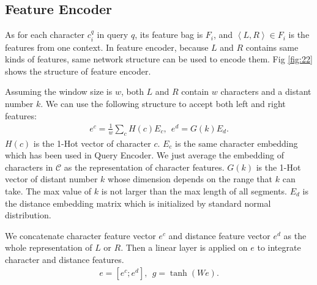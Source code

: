 \subsection{Feature Encoder}

As for each character $c_i^q$ in query $q$, its feature bag is $F_i$, and $\left \langle L, R \right \rangle \in F_i$ is the features from one context. In feature encoder, because $L$ and $R$ contains same kinds of features, same network structure can be used to encode them. Fig \ref{fig:22} shows the structure of feature encoder.


Assuming the window size is $w$, both $L$ and $R$ contain $w$ characters and a distant number $k$. We can use the following structure to accept both left and right features:
\begin{align*}
	e^c = \frac{1} {w} \sum_{c} {H(c)E_c}, \ \ e^d = G(k)E_d.
\end{align*}
$H(c)$ is the 1-Hot vector of character $c$. $E_c$ is the same character embedding which has been used in Query Encoder. We just average the embedding of characters in $\mathcal{C}$ as the representation of character features. $G(k)$ is the 1-Hot vector of distant number $k$ whose dimension depends on the range that $k$ can take. The max value of $k$ is not larger than the max length of all segments. $E_d$ is the distance embedding matrix which is initialized by standard normal distribution.

We concatenate character feature vector $e^c$ and distance feature vector $e^d$ as the whole representation of $L$ or $R$. Then a linear layer is applied on $e$ to integrate character and distance features.
\begin{align*}
	e = [e^c; e^d], \ \ g = \tanh(We).
\end{align*}


